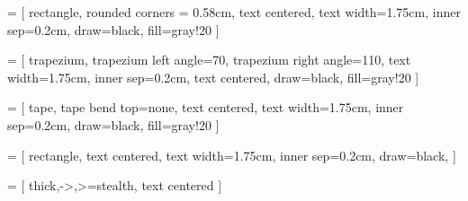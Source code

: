  = [
    rectangle, rounded corners = 0.58cm,
    text centered,
    text width=1.75cm,
    inner sep=0.2cm,
    draw=black,
    fill=gray!20
]

 = [
    trapezium, 
    trapezium left angle=70, 
    trapezium right angle=110, 
    text width=1.75cm, 
    inner sep=0.2cm,
    text centered, 
    draw=black,
    fill=gray!20
]

 = [
    tape,
    tape bend top=none,
    text centered,
    text width=1.75cm,
    inner sep=0.2cm,
    draw=black,
    fill=gray!20
]

 = [
    rectangle, 
    text centered, 
    text width=1.75cm,
    inner sep=0.2cm,
    draw=black, 
]

 = [
    thick,->,>=stealth,
    text centered
]


